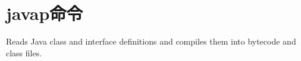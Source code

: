 \section{javap命令}
\label{chap:javac}

Reads Java class and interface definitions and compiles them into bytecode and class files.

\begin{lstlisting}[language=cshell]
    
\end{lstlisting}
